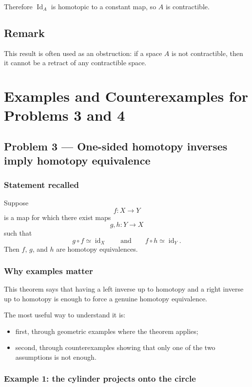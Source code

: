 \documentclass[12pt,a4paper]{article}
\theoremstyle{notespace}
\begin{document}
Therefore \(\operatorname{Id}_A\) is homotopic to a constant map, so \(A\) is contractible.

\subsection{Remark}

This result is often used as an obstruction: if a space \(A\) is not contractible, then it cannot be a retract of any contractible space.

\section{Examples and Counterexamples for Problems 3 and 4}

\subsection{Problem 3 --- One-sided homotopy inverses imply homotopy equivalence}

\subsubsection{Statement recalled}

Suppose
\[
f:X\to Y
\]
is a map for which there exist maps
\[
g,h:Y\to X
\]
such that
\[
g\circ f \simeq \operatorname{id}_X
\qquad\text{and}\qquad
f\circ h \simeq \operatorname{id}_Y.
\]
Then \(f\), \(g\), and \(h\) are homotopy equivalences.

\subsubsection{Why examples matter}

This theorem says that having a left inverse up to homotopy and a right inverse up to homotopy is enough to force a genuine homotopy equivalence.

The most useful way to understand it is:

\begin{itemize}
	\item first, through geometric examples where the theorem applies;
	\item second, through counterexamples showing that only one of the two assumptions is not enough.
\end{itemize}

\subsubsection{Example 1: the cylinder projects onto the circle}
\end{document}
